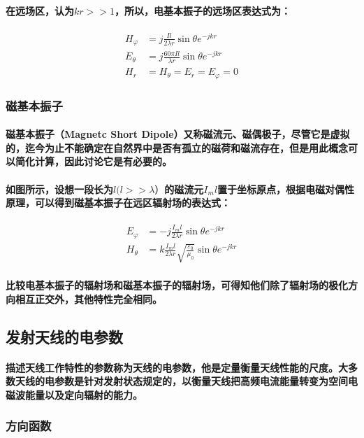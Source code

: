\documentclass[UTF8]{ctexart}
\begin{document}
\paragraph{在远场区，认为$kr>>1$，所以，电基本振子的远场区表达式为：}
\begin{align}
H_{\varphi} & = j\frac{Il}{2\lambda r}\sin \theta e^{-jkr} \\
E_{\theta} & = j\frac{60\pi Il}{\lambda r}\sin \theta e^{-jkr} \\ 
H_r & = H_{\theta} = E_r = E_{\varphi} = 0
\end{align}
\subsubsection{磁基本振子}
\paragraph{磁基本振子（Magnetc Short Dipole）又称磁流元、磁偶极子，尽管它是虚拟的，迄今为止不能确定在自然界中是否有孤立的磁荷和磁流存在，但是用此概念可以简化计算，因此讨论它是有必要的。}
\paragraph{如图所示，设想一段长为$l(l>>\lambda）$的磁流元$I_ml$置于坐标原点，根据电磁对偶性原理，可以得到磁基本振子在远区辐射场的表达式：}
\begin{align}
E_{\varphi} & = -j\frac{I_ml}{2\lambda r}\sin \theta e^{-jkr}\\H_{\theta} & = k\frac{I_ml}{2\lambda r}\sqrt{\frac{\varepsilon_0}{\mu_0}}\sin \theta e^{-jkr}
\end{align}
\paragraph{比较电基本振子的辐射场和磁基本振子的辐射场，可得知他们除了辐射场的极化方向相互正交外，其他特性完全相同。}
\subsection{发射天线的电参数}
\paragraph{描述天线工作特性的参数称为天线的电参数，他是定量衡量天线性能的尺度。大多数天线的电参数是针对发射状态规定的，以衡量天线把高频电流能量转变为空间电磁波能量以及定向辐射的能力。}
\subsubsection{方向函数}
\end{document}
